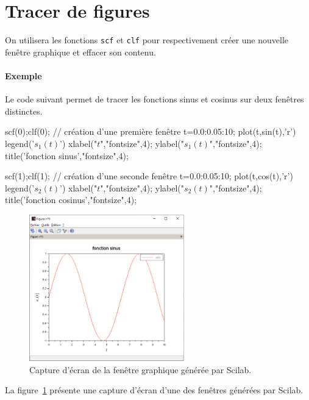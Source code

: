 \section{Tracer de figures}
On utilisera les fonctions \verb?scf? et \verb?clf?  pour respectivement
créer une nouvelle fenêtre graphique et effacer son contenu. 
\paragraph{Exemple}
Le code suivant permet de tracer les fonctions sinus et cosinus sur deux 
fenêtres distinctes. 
\begin{Scilabcode}
scf(0);clf(0); // création d'une première fenêtre
t=0.0:0.05:10; 
plot(t,sin(t),'r')
legend('$s_1(t)$')
xlabel("$t$","fontsize",4);
ylabel("$s_1(t)$","fontsize",4);
title('fonction sinus',"fontsize",4);

scf(1);clf(1); // création d'une seconde fenêtre    
t=0.0:0.05:10;
plot(t,cos(t),'r')
legend('$s_2(t)$')
xlabel("$t$","fontsize",4);
ylabel("$s_2(t)$","fontsize",4);
title('fonction cosinus',"fontsize",4);  
\end{Scilabcode}
\begin{figure}[!ht]
    \centering
    \includegraphics[width=0.6\textwidth]{fig/capture_SCILAB.eps}
    \caption{Capture d'écran de la fenêtre graphique générée 
             par Scilab.\label{fig-capture-SCILAB}}
\end{figure}
La figure~\cref{fig-capture-SCILAB} présente une capture d'écran 
d'une des fenêtres générées par Scilab.
          
